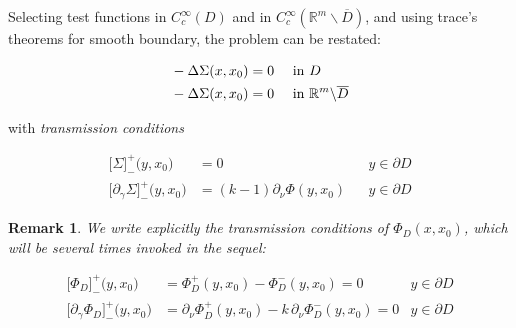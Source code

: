 \documentclass[10pt, a4paper, twoside, openright]{book}
\theoremstyle{definition}
\theoremstyle{plain}
\theoremstyle{plain}
\theoremstyle{plain}
\theoremstyle{plain}
\newtheorem{remark}[subsection]{Remark}
\theoremstyle{plain}
\theoremstyle{plain}
\theoremstyle{plain}
\theoremstyle{plain}
\begin{document}
Selecting test functions in $C^\infty_c(D)$ and in $C^\infty_c(\mathbb{R}^m\backslash \overline{D})$, and using trace's theorems for smooth boundary, the problem can be restated:
\begin{center}
\colorbox{light-gray}{\color{black}\parbox{\textwidth}{
\begin{align}
 &-\Delta \Sigma(x,x_0) = 0\quad\textup{ in }D \label{eq:laplacian-D}\\
 &-\Delta \Sigma(x,x_0) = 0\quad\textup{ in }\mathbb{R}^m\backslash\overline{D}\label{eq:laplacian-outside-D}
\end{align}
\begin{center}with \emph{transmission conditions}\end{center}
\begin{subequations}
\begin{align}
 \bigl[\Sigma\bigr]^+_-\bigl(y,x_0\bigr) &=0 && y \in\partial D \label{eq:transmissionF0}\\ 
 \bigl[\partial_\gamma \Sigma\bigr]^+_-\bigl(y,x_0\bigr) &= (k - 1)\partial_\nu \Phi(y,x_0) && y \in\partial D \label{eq:transmissionF1}
\end{align}
\end{subequations}
}}
\end{center}
\begin{remark}
 We write explicitly the transmission conditions of $\Phi_D(x,x_0)$, which will be several times invoked in the sequel:
\begin{center}
\colorbox{light-gray}{\color{black}\parbox{\textwidth}{
\begin{subequations}
\begin{align}
 \bigl[\Phi_D\bigr]^+_-\bigl(y,x_0\bigr)&=\Phi_D^+(y,x_0) - \Phi_D^-(y,x_0) =0 & y \in\partial D \label{eq:transmissionPhiD0}\\ 
 \bigl[\partial_\gamma \Phi_D\bigr]^+_-\bigl(y,x_0\bigr) &= \partial_\nu \Phi_D^+(y,x_0) - k\,\partial_\nu \Phi_D^-(y,x_0) =0 & y \in\partial D \label{eq:transmissionPhiD1}
\end{align}
\end{subequations}
}}
\end{center}
\end{remark}
\end{document}

